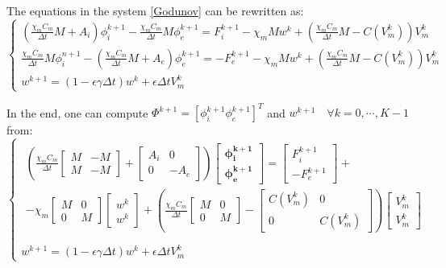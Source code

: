 \documentclass[a4paper,11pt]{article}
\begin{document}
The equations in the system \ref{Godunov} can be rewritten as:
\begin{equation*}
\begin{cases}
\left( \frac{\chi_m C_m}{\Delta t} M + A_i \right ) \phi_i^{k+1} - \frac{\chi_m C_m}{\Delta t} M \phi_e^{k+1} = F_i^{k+1} - \chi_m M w^k + \left( \frac{\chi_m C_m}{\Delta t} M- C(V_m^k)\right) V_m^k\\
\frac{\chi_m C_m}{\Delta t} M  \phi_i^{n+1} - \left(\frac{\chi_m C_m}{\Delta t} M + A_e \right) \phi_e^{k+1} =  -F_e^{k+1} - \chi_m M w^k + \left( \frac{\chi_m C_m}{\Delta t} M- C(V_m^k)\right) V_m^k \\
w^{k+1} = (1-\epsilon \gamma \Delta t) w^k + \epsilon \Delta tV_m^k
\end{cases}
\end{equation*}

\noindent In the end, one can compute $\Phi^{k+1}=[\phi_i^{k+1} \phi_e^{k+1}]^T$ and $w^{k+1} \quad \forall k=0, \cdots, K-1$ from: 
\begin{equation}
\begin{cases}
\begin{gathered}
\left(
\frac{\chi_m C_m}{\Delta t} \begin{bmatrix}M & -M \\ M & -M\end{bmatrix}
+ \begin{bmatrix} A_i & 0 \\ 0 & -A_e \end{bmatrix}
\right) \begin{bmatrix} \bm{\phi_i^{k+1}} \\ \bm{\phi_e^{k+1}}  \end{bmatrix} =
\begin{bmatrix} F_i^{k+1} \\ -F_e^{k+1} \end{bmatrix} + \\ -
\chi_m\begin{bmatrix} M & 0 \\ 0 & M \end{bmatrix} \begin{bmatrix} w^k \\ w^k \end{bmatrix} +
\left(\frac{\chi_mC_m}{\Delta t}\begin{bmatrix} M & 0 \\ 0 & M \end{bmatrix}
- \begin{bmatrix} C(V_m^k) & 0 \\ 0 & C(V_m^k)\end{bmatrix} 
\right) \begin{bmatrix} V_m^k \\ V_m^k \end {bmatrix}
\end{gathered} \\ \\
w^{k+1} = (1-\epsilon \gamma \Delta t) w^k + \epsilon \Delta tV_m^k
\end{cases}
\end{equation}
\end{document}
